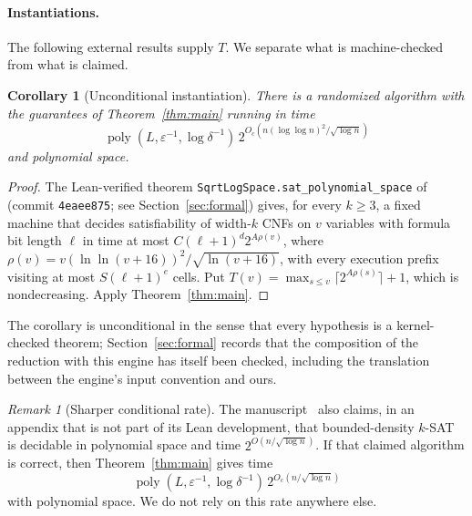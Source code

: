 \documentclass[11pt]{article}
\newtheorem{corollary}[theorem]{Corollary}
\theoremstyle{remark}
\newtheorem{remark}[theorem]{Remark}
\newcommand{\poly}{\operatorname{poly}}
\newcommand{\eps}{\varepsilon}
\newcommand{\lean}[1]{\texttt{#1}}
\begin{document}
\paragraph{Instantiations.}
The following external results supply \(T\). We separate what is
machine-checked from what is claimed.

\begin{corollary}[Unconditional instantiation]\label{cor:unconditional}
There is a randomized algorithm with the guarantees of
Theorem~\ref{thm:main} running in time
\begin{equation}\label{eq:formalrate}
 \poly(L,\eps^{-1},\log\delta^{-1})\,
 2^{O_c(n(\log\log n)^2/\sqrt{\log n})}
\end{equation}
and polynomial space.
\end{corollary}
\begin{proof}
The Lean-verified theorem
\lean{SqrtLogSpace.sat\_polynomial\_space} of~\cite{openai2026eth}
(commit \texttt{4eaee875}; see Section~\ref{sec:formal}) gives, for every
\(k\ge3\), a fixed machine that decides satisfiability of width-\(k\)
CNFs on \(v\) variables with formula bit length \(\ell\) in time at most
\(C(\ell+1)^d2^{A\rho(v)}\), where
\(\rho(v)=v(\ln\ln(v+16))^2/\sqrt{\ln(v+16)}\), with every execution
prefix visiting at most \(S(\ell+1)^e\) cells. Put
\(T(v)=\max_{s\le v}\lceil2^{A\rho(s)}\rceil+1\), which is nondecreasing.
Apply Theorem~\ref{thm:main}.
\end{proof}

The corollary is unconditional in the sense that every hypothesis is a
kernel-checked theorem; Section~\ref{sec:formal} records that the
composition of the reduction with this engine has itself been checked,
including the translation between the engine's input convention and ours.

\begin{remark}[Sharper conditional rate]\label{rem:sharp}
The manuscript~\cite{openai2026eth} also claims, in an appendix that is
not part of its Lean development, that bounded-density \(k\)-SAT is
decidable in polynomial space and time
\(2^{O(n/\sqrt{\log n})}\). If that claimed algorithm is correct, then
Theorem~\ref{thm:main} gives time
\begin{equation}\label{eq:sharp}
 \poly(L,\eps^{-1},\log\delta^{-1})\,
 2^{O_c(n/\sqrt{\log n})}
\end{equation}
with polynomial space. We do not rely on this rate anywhere else.
\end{remark}
\end{document}

